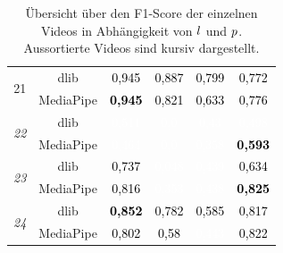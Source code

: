 \begin{table}[]
\begin{tabular}{c | c | c c c c}
\multirow{2}{*}{21} & dlib & \cellcolor[HTML] {0EF100}\textcolor{black}{0,945} & \cellcolor[HTML] {1CE300}\textcolor{black}{0,887} & \cellcolor[HTML] {32CC00}\textcolor{black}{0,799} & \cellcolor[HTML] {39C500}\textcolor{black}{0,772} \\ & MediaPipe & \cellcolor[HTML] {0EF100}\textcolor{black}{\textbf{0,945}} & \cellcolor[HTML] {2DD200}\textcolor{black}{0,821} & \cellcolor[HTML] {5DA200}\textcolor{black}{0,633} & \cellcolor[HTML] {38C600}\textcolor{black}{0,776} \\ \hline
\multirow{2}{*}{\textit{22}} & dlib & \cellcolor[HTML] {7D8200}\textcolor{white}{0,511} & \cellcolor[HTML] {FF0000}\textcolor{white}{0,0} & \cellcolor[HTML] {916E00}\textcolor{white}{0,43} & \cellcolor[HTML] {807F00}\textcolor{white}{0,498} \\ & MediaPipe & \cellcolor[HTML] {897600}\textcolor{white}{0,464} & \cellcolor[HTML] {FF0000}\textcolor{white}{0,0} & \cellcolor[HTML] {A35B00}\textcolor{white}{0,358} & \cellcolor[HTML] {689700}\textcolor{black}{\textbf{0,593}} \\ \hline
\multirow{2}{*}{\textit{23}} & dlib & \cellcolor[HTML] {42BC00}\textcolor{black}{0,737} & \cellcolor[HTML] {F30C00}\textcolor{white}{0,048} & \cellcolor[HTML] {8F7000}\textcolor{white}{0,439} & \cellcolor[HTML] {5DA200}\textcolor{black}{0,634} \\ & MediaPipe & \cellcolor[HTML] {2FD000}\textcolor{black}{0,816} & \cellcolor[HTML] {A55900}\textcolor{white}{0,353} & \cellcolor[HTML] {8F7000}\textcolor{white}{0,438} & \cellcolor[HTML] {2CD300}\textcolor{black}{\textbf{0,825}} \\ \hline
\multirow{2}{*}{\textit{24}} & dlib & \cellcolor[HTML] {25DA00}\textcolor{black}{\textbf{0,852}} & \cellcolor[HTML] {37C800}\textcolor{black}{0,782} & \cellcolor[HTML] {699500}\textcolor{black}{0,585} & \cellcolor[HTML] {2ED100}\textcolor{black}{0,817} \\ & MediaPipe & \cellcolor[HTML] {31CD00}\textcolor{black}{0,802} & \cellcolor[HTML] {6B9300}\textcolor{black}{0,58} & \cellcolor[HTML] {8E7100}\textcolor{white}{0,443} & \cellcolor[HTML] {2DD200}\textcolor{black}{0,822} \\ \hline

    \end{tabular}
    \caption{Übersicht über den F1-Score der einzelnen Videos in Abhängigkeit von $l$ und $p$. Aussortierte Videos sind kursiv dargestellt.}
    \label{tab:evaluation:best:results}
\end{table}

